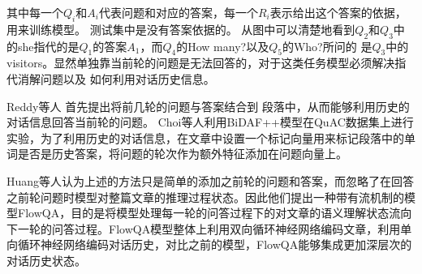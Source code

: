 其中每一个$Q_i$和$A_i$代表问题和对应的答案，每一个$R_i$表示给出这个答案的依据，用来训练模型。
测试集中是没有答案依据的。
从图中可以清楚地看到$Q_2$和$Q_3$中的she指代的是$Q_1$的答案$A_1$，而$Q_4$的How many?以及$Q_5$的Who?所问的
是$Q_3$中的visitors。显然单独靠当前轮的问题是无法回答的，对于这类任务模型必须解决指代消解问题以及
如何利用对话历史信息。

Reddy等人
首先提出将前几轮的问题与答案结合到
段落中，从而能够利用历史的对话信息回答当前轮的问题。
Choi等人利用BiDAF++模型在QuAC数据集上进行实验，为了利用历史的对话信息，在文章中设置一个标记向量用来标记段落中的单词是否是历史答案，将问题的轮次作为额外特征添加在问题向量上。

Huang等人认为上述的方法只是简单的添加之前轮的问题和答案，而忽略了在回答之前轮问题时模型对整篇文章的推理过程状态。因此他们提出一种带有流机制的模型FlowQA，目的是将模型处理每一轮的问答过程下的对文章的语义理解状态流向下一轮的问答过程。FlowQA模型整体上利用双向循环神经网络编码文章，利用单向循环神经网络编码对话历史，对比之前的模型，FlowQA能够集成更加深层次的对话历史状态。


